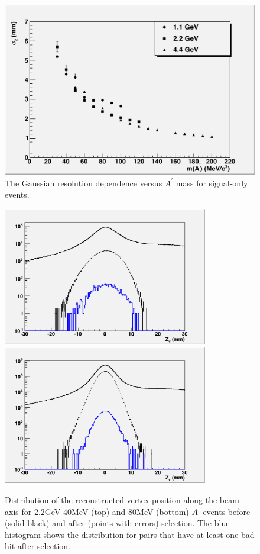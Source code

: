 \begin{figure}
\includegraphics[scale=0.8]{performance/tracking_performance/vertexRes-1pt1-2pt2-6pt6.pdf}
\caption{ The Gaussian resolution dependence versus $A^\prime$ mass for signal-only events.   }
\label{fig:vtxResolutionGauss}
\end{figure}
   

\begin{figure}
\includegraphics[width=0.8\textwidth]{performance/tracking_performance/vtx2pt2-40mev.pdf}
\includegraphics[width=0.8\textwidth]{performance/tracking_performance/vtx2pt2-80mev.pdf}
\caption{Distribution of the reconstructed vertex position along the beam axis for 
2.2GeV 40MeV (top) and 80MeV (bottom) $A^\prime$ events before (solid black) and after (points 
with errors) selection.  The blue histogram shows the distribution for pairs that have 
at least one bad hit after selection.    }
\label{fig:vtxResolutionRaw}	
\end{figure}
  
%

